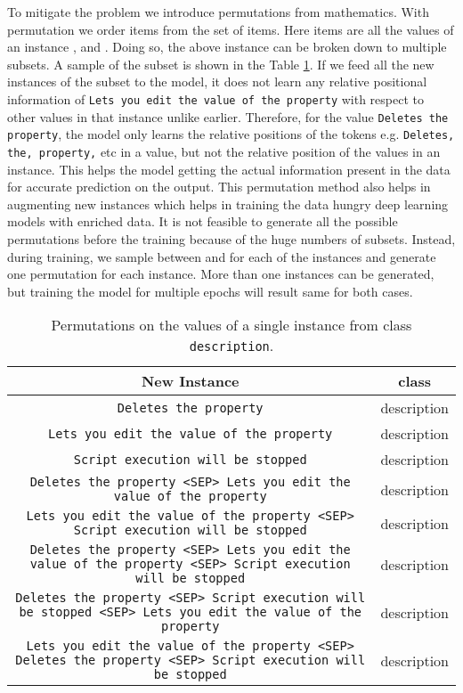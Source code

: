 \documentclass{article}
\begin{document}
To mitigate the problem we introduce permutations from mathematics. With permutation we order  items from the set of  items. Here  items are all the values of an instance , and . Doing so, the above instance can be broken down to multiple subsets. A sample of the subset is shown in the Table \ref{tab:permutation}. If we feed all the new instances of the subset to the model, it does not learn any relative positional information of \texttt{Lets you edit the value of the property} with respect to other values in that instance unlike earlier. Therefore, for the value \texttt{Deletes the property}, the model only learns the relative positions of the tokens e.g. \texttt{Deletes, the, property,} etc in a value, but not the relative position of the values in an instance. This helps the model getting the actual information present in the data for accurate prediction on the output. This permutation method also helps in augmenting new instances which helps in training the data hungry deep learning models with enriched data. It is not feasible to generate all the possible permutations before the training because of the huge numbers of subsets. Instead, during training, we sample  between  and  for each of the instances and generate one permutation for each instance. More than one instances can be generated, but training the model for multiple epochs will result same for both cases.


\begin{table}[ht]
	\centering
	\begin{adjustbox}{width=\columnwidth,center}
	\begin{tabular}{cc}
		\hline
		\textbf{New Instance} & \textbf{class} \\ \hline
		\texttt{Deletes the property} & description \\ 
		\texttt{Lets you edit the value of the property} & description \\ 
		\texttt{Script execution will be stopped} & description \\ 
		\texttt{Deletes the property <SEP> Lets you edit the value of the property} & description \\ 
		\texttt{Lets you edit the value of the property <SEP> Script execution will be stopped} & description \\ 
		\texttt{Deletes the property <SEP> Lets you edit the value of the property <SEP> Script execution will be stopped} & description \\ 
		\texttt{Deletes the property <SEP> Script execution will be stopped <SEP> Lets you edit the value of the property} & description \\ 
		\texttt{Lets you edit the value of the property <SEP> Deletes the property <SEP> Script execution will be stopped} & description \\ \hline
		
	\end{tabular}
\end{adjustbox}
	\caption{Permutations on the values of a single instance from class \texttt{description}.}
	\label{tab:permutation}
\end{table}
\end{document}
